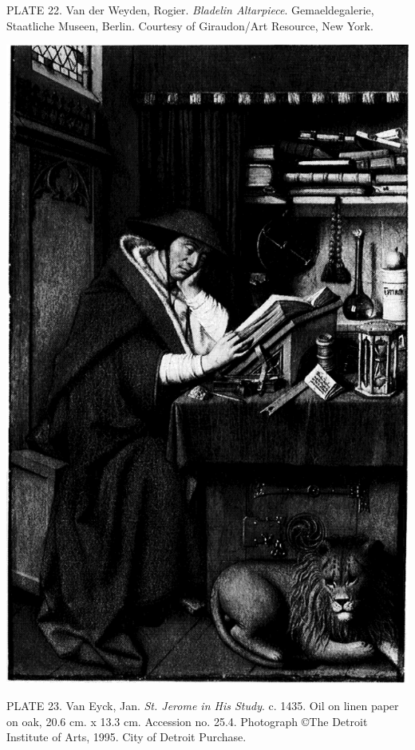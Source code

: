 PLATE 22. Van der Weyden, Rogier. \emph{Bladelin Altarpiece}.
Gemaeldegalerie, Staatliche Museen, Berlin. Courtesy of Giraudon/Art
Resource, New York.

\protect\hypertarget{20_ILLUSTRATIONS_FOLLOW_PAGE.xhtmlux5cux23id_22}{}{}\includegraphics{include/html/images/342_1.png}

PLATE 23. Van Eyck, Jan. \emph{St. Jerome in His Study}. c. 1435. Oil on
linen paper on oak, 20.6 cm. x 13.3 cm. Accession no. 25.4. Photograph
©The Detroit Institute of Arts, 1995. City of Detroit Purchase.

